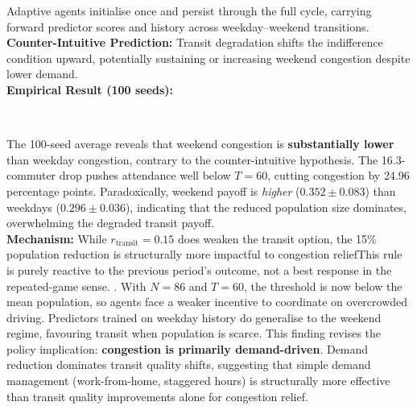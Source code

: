 Adaptive agents initialise once and persist through the full cycle, carrying forward predictor scores and history across weekday--weekend transitions. \\

\textbf{Counter-Intuitive Prediction:} Transit degradation shifts the indifference condition upward, potentially sustaining or increasing weekend congestion despite lower demand. \\

\textbf{Empirical Result (100 seeds):} \\

\begin{table}[H]
\centering
\small
{} \\
\caption{Weekend effect: 15\% population reduction with 50\% transit quality degradation}
\end{table}

The 100-seed average reveals that weekend congestion is \textbf{substantially lower} than weekday congestion, contrary to the counter-intuitive hypothesis. The 16.3-commuter drop pushes attendance well below $T=60$, cutting congestion by 24.96 percentage points. Paradoxically, weekend payoff is \textit{higher} ($0.352 \pm 0.083$) than weekdays ($0.296 \pm 0.036$), indicating that the reduced population size dominates, overwhelming the degraded transit payoff. \\

\textbf{Mechanism:} While $r_{\text{transit}}=0.15$ does weaken the transit option, the 15\% population reduction is structurally more impactful to congestion reliefThis rule is purely reactive to the previous period's outcome, not a best response in the repeated-game sense.
. With $N=86$ and $T=60$, the threshold is now below the mean population, so agents face a weaker incentive to coordinate on overcrowded driving. Predictors trained on weekday history do generalise to the weekend regime, favouring transit when population is scarce. This finding revises the policy implication: \textbf{congestion is primarily demand-driven}. Demand reduction dominates transit quality shifts, suggesting that simple demand management (work-from-home, staggered hours) is structurally more effective than transit quality improvements alone for congestion relief. \\

